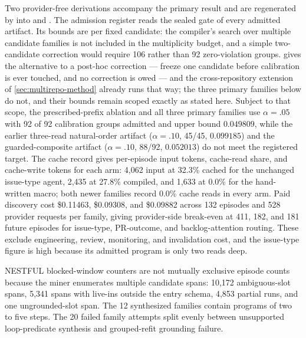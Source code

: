 Two provider-free derivations accompany the primary result and are regenerated by
 into  and
.  The admission register reads the sealed gate of
every admitted artifact.  Its bounds are per fixed candidate: the compiler's search over
multiple candidate families is not included in the multiplicity budget, and a simple
two-candidate correction would require 106 rather than 92 zero-violation groups.
 gives the alternative to a post-hoc correction --- freeze one candidate
before calibration is ever touched, and no correction is owed --- and the cross-repository
extension of \cref{sec:multirepo-method} already runs that way; the three primary families
below do not, and their bounds remain scoped exactly as stated here.  Subject
to that scope, the prescribed-prefix ablation and all three primary families use
$\alpha=.05$ with 92 of 92 calibration groups admitted and upper bound $0.049809$, while the
earlier three-read natural-order artifact ($\alpha=.10$, 45/45, $0.099185$) and the
guarded-composite artifact ($\alpha=.10$, 88/92, $0.052013$) do not meet the registered
target.  The cache record gives per-episode input tokens, cache-read share, and cache-write
tokens for each arm: 4,062 input at 32.3\% cached for the unchanged issue-type agent, 2,435
at 27.8\% compiled, and 1,633 at 0.0\% for the hand-written macro; both newer families
record 0.0\% cache reads in every arm.  Paid discovery cost \$0.11463, \$0.09308, and
\$0.09882 across 132 episodes and 528 provider requests per family, giving provider-side
break-even at 411, 182, and 181 future episodes for issue-type, PR-outcome, and
backlog-attention routing.  These exclude engineering, review, monitoring, and invalidation
cost, and the issue-type figure is high because its admitted program is only two reads deep.

NESTFUL blocked-window counters are not mutually exclusive episode counts because the
miner enumerates multiple candidate spans: 10,172 ambiguous-slot spans, 5,341 spans with
live-ins outside the entry schema, 4,853 partial runs, and one ungrounded-slot span.  The
12 synthesized families contain programs of two to five steps.  The 20 failed family
attempts split evenly between unsupported loop-predicate synthesis and grouped-refit
grounding failure.

\begin{table}[t]
  \centering
  \caption{The frozen portfolio decision and the fresh-cohort evaluation that followed it,
  the numeric backing of \cref{fig:portfolio-selection}.  $R_q^+/R_u^+$ are the one-sided
  upper bounds on quality risk and regret risk under the 15\% pilot limit.  The lower block
  is a different cohort: 12 previously unseen issues, evaluated after the decision was
  sealed.}
  \label{tab:portfolio-results}
  \small
  
\end{table}

